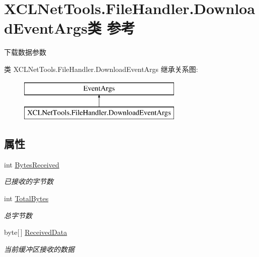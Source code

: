 \hypertarget{class_x_c_l_net_tools_1_1_file_handler_1_1_download_event_args}{}\section{X\+C\+L\+Net\+Tools.\+File\+Handler.\+Download\+Event\+Args类 参考}
\label{class_x_c_l_net_tools_1_1_file_handler_1_1_download_event_args}


下载数据参数  


类 X\+C\+L\+Net\+Tools.\+File\+Handler.\+Download\+Event\+Args 继承关系图\+:\begin{figure}[H]
\begin{center}
\leavevmode
\includegraphics[height=2.000000cm]{class_x_c_l_net_tools_1_1_file_handler_1_1_download_event_args}
\end{center}
\end{figure}
\subsection*{属性}
\begin{DoxyCompactItemize}
\item 
int \hyperlink{class_x_c_l_net_tools_1_1_file_handler_1_1_download_event_args_a1ea772d1ec4b2e0f1f3001fe069bac42}{Bytes\+Received}
\begin{DoxyCompactList}\small\item\em 已接收的字节数 \end{DoxyCompactList}\item 
int \hyperlink{class_x_c_l_net_tools_1_1_file_handler_1_1_download_event_args_a344cbcca5a213a50ecd25b90340be816}{Total\+Bytes}
\begin{DoxyCompactList}\small\item\em 总字节数 \end{DoxyCompactList}\item 
byte\mbox{[}$\,$\mbox{]} \hyperlink{class_x_c_l_net_tools_1_1_file_handler_1_1_download_event_args_ae080073b3629650c3befb398e9d7c2e8}{Received\+Data}
\begin{DoxyCompactList}\small\item\em 当前缓冲区接收的数据 \end{DoxyCompactList}\end{DoxyCompactItemize}


